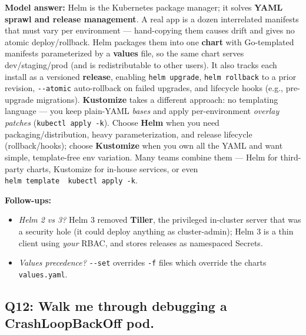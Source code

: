 \documentclass[11pt]{article}
\providecommand{\tightlist}{\setlength{\itemsep}{1pt}\setlength{\parskip}{0pt}}
\begin{document}
\textbf{Model answer:}
Helm is the Kubernetes package manager; it solves \textbf{YAML sprawl and release management}. A real app is a dozen interrelated manifests that must vary per environment --- hand-copying them causes drift and gives no atomic deploy/rollback. Helm packages them into one \textbf{chart} with Go-templated manifests parameterized by a \textbf{values} file, so the same chart serves dev/staging/prod (and is redistributable to other users). It also tracks each install as a versioned \textbf{release}, enabling \texttt{helm\ upgrade}, \texttt{helm\ rollback} to a prior revision, \texttt{-\/-atomic} auto-rollback on failed upgrades, and lifecycle hooks (e.g., pre-upgrade migrations). \textbf{Kustomize} takes a different approach: no templating language --- you keep plain-YAML \emph{bases} and apply per-environment \emph{overlay patches} (\texttt{kubectl\ apply\ -k}). Choose \textbf{Helm} when you need packaging/distribution, heavy parameterization, and release lifecycle (rollback/hooks); choose \textbf{Kustomize} when you own all the YAML and want simple, template-free env variation. Many teams combine them --- Helm for third-party charts, Kustomize for in-house services, or even \texttt{helm\ template\ \textbar{}\ kubectl\ apply\ -k}.

\textbf{Follow-ups:}

\begin{itemize}
\tightlist
\item
  \emph{Helm 2 vs 3?} Helm 3 removed \textbf{Tiller}, the privileged in-cluster server that was a security hole (it could deploy anything as cluster-admin); Helm 3 is a thin client using \emph{your} RBAC, and stores releases as namespaced Secrets.
\item
  \emph{Values precedence?} \texttt{-\/-set} overrides \texttt{-f} files which override the chart\textquotesingle s \texttt{values.yaml}.
\end{itemize}

\subsection{Q12: Walk me through debugging a CrashLoopBackOff pod.}\label{q12-walk-me-through-debugging-a-crashloopbackoff-pod}
\end{document}
